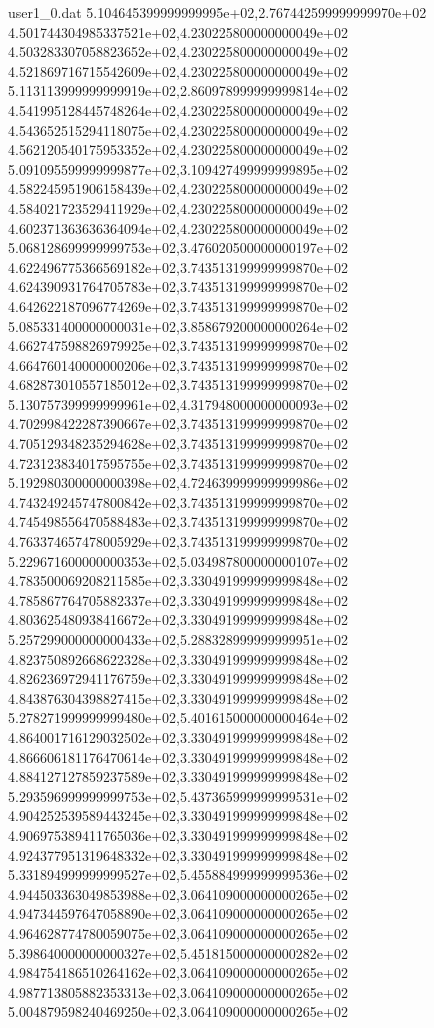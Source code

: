 \begin{filecontents}{user1_0.dat}
5.104645399999999995e+02,2.767442599999999970e+02
4.501744304985337521e+02,4.230225800000000049e+02
4.503283307058823652e+02,4.230225800000000049e+02
4.521869716715542609e+02,4.230225800000000049e+02
5.113113999999999919e+02,2.860978999999999814e+02
4.541995128445748264e+02,4.230225800000000049e+02
4.543652515294118075e+02,4.230225800000000049e+02
4.562120540175953352e+02,4.230225800000000049e+02
5.091095599999999877e+02,3.109427499999999895e+02
4.582245951906158439e+02,4.230225800000000049e+02
4.584021723529411929e+02,4.230225800000000049e+02
4.602371363636364094e+02,4.230225800000000049e+02
5.068128699999999753e+02,3.476020500000000197e+02
4.622496775366569182e+02,3.743513199999999870e+02
4.624390931764705783e+02,3.743513199999999870e+02
4.642622187096774269e+02,3.743513199999999870e+02
5.085331400000000031e+02,3.858679200000000264e+02
4.662747598826979925e+02,3.743513199999999870e+02
4.664760140000000206e+02,3.743513199999999870e+02
4.682873010557185012e+02,3.743513199999999870e+02
5.130757399999999961e+02,4.317948000000000093e+02
4.702998422287390667e+02,3.743513199999999870e+02
4.705129348235294628e+02,3.743513199999999870e+02
4.723123834017595755e+02,3.743513199999999870e+02
5.192980300000000398e+02,4.724639999999999986e+02
4.743249245747800842e+02,3.743513199999999870e+02
4.745498556470588483e+02,3.743513199999999870e+02
4.763374657478005929e+02,3.743513199999999870e+02
5.229671600000000353e+02,5.034987800000000107e+02
4.783500069208211585e+02,3.330491999999999848e+02
4.785867764705882337e+02,3.330491999999999848e+02
4.803625480938416672e+02,3.330491999999999848e+02
5.257299000000000433e+02,5.288328999999999951e+02
4.823750892668622328e+02,3.330491999999999848e+02
4.826236972941176759e+02,3.330491999999999848e+02
4.843876304398827415e+02,3.330491999999999848e+02
5.278271999999999480e+02,5.401615000000000464e+02
4.864001716129032502e+02,3.330491999999999848e+02
4.866606181176470614e+02,3.330491999999999848e+02
4.884127127859237589e+02,3.330491999999999848e+02
5.293596999999999753e+02,5.437365999999999531e+02
4.904252539589443245e+02,3.330491999999999848e+02
4.906975389411765036e+02,3.330491999999999848e+02
4.924377951319648332e+02,3.330491999999999848e+02
5.331894999999999527e+02,5.455884999999999536e+02
4.944503363049853988e+02,3.064109000000000265e+02
4.947344597647058890e+02,3.064109000000000265e+02
4.964628774780059075e+02,3.064109000000000265e+02
5.398640000000000327e+02,5.451815000000000282e+02
4.984754186510264162e+02,3.064109000000000265e+02
4.987713805882353313e+02,3.064109000000000265e+02
5.004879598240469250e+02,3.064109000000000265e+02

\end{filecontents}
